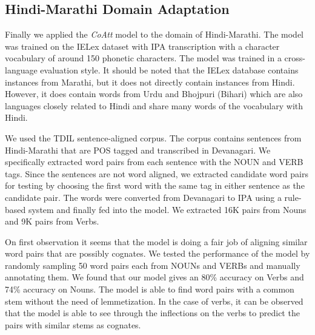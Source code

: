 \documentclass[11pt,letterpaper]{article}
\begin{document}

\subsection{Hindi-Marathi Domain Adaptation}

Finally we applied the \textit{CoAtt} model to the domain of Hindi-Marathi. The model was trained on the IELex dataset with IPA transcription with a character vocabulary of around 150 phonetic characters. The model was trained in a cross-language evaluation style. It should be noted that the IELex database contains instances from Marathi, but it does not directly contain instances from Hindi. However, it does contain words from Urdu and Bhojpuri (Bihari) which are also languages closely related to Hindi and share many words of the vocabulary with Hindi.

We used the TDIL sentence-aligned corpus. The corpus contains sentences from Hindi-Marathi that are POS tagged and transcribed in Devanagari. We specifically extracted word pairs from each sentence with the NOUN and VERB tags. Since the sentences are not word aligned, we extracted candidate word pairs for testing by choosing the first word with the same tag in either sentence as the candidate pair. The words were converted from Devanagari to IPA using a rule-based system and finally fed into the model. We extracted 16K pairs from Nouns and 9K pairs from Verbs.

On first observation it seems that the model is doing a fair job of aligning similar word pairs that are possibly cognates. We tested the performance of the model by randomly sampling 50 word pairs each from NOUNs and VERBs and manually annotating them. We found that our model gives an 80\% accuracy on Verbs and 74\% accuracy on Nouns. The model is able to find word pairs with a common stem without the need of lemmetization. In the case of verbs, it can be observed that the model is able to see through the inflections on the verbs to predict the pairs with similar stems as cognates. 
\end{document}
